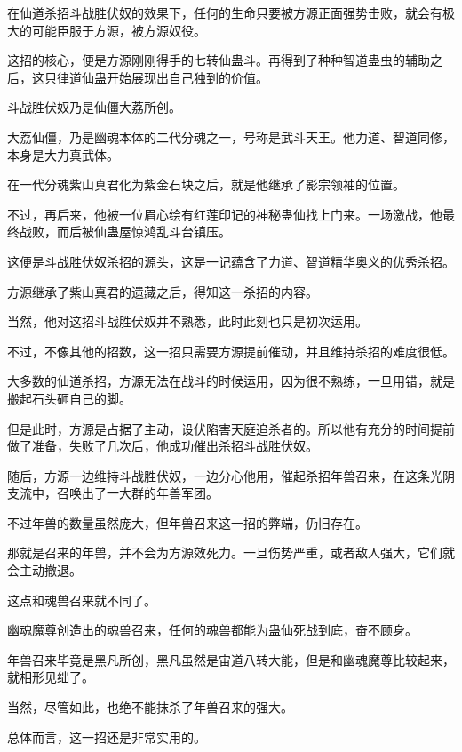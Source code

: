 
\begin{this_body}



在仙道杀招斗战胜伏奴的效果下，任何的生命只要被方源正面强势击败，就会有极大的可能臣服于方源，被方源奴役。

这招的核心，便是方源刚刚得手的七转仙蛊斗。再得到了种种智道蛊虫的辅助之后，这只律道仙蛊开始展现出自己独到的价值。

斗战胜伏奴乃是仙僵大荔所创。

大荔仙僵，乃是幽魂本体的二代分魂之一，号称是武斗天王。他力道、智道同修，本身是大力真武体。

在一代分魂紫山真君化为紫金石块之后，就是他继承了影宗领袖的位置。

不过，再后来，他被一位眉心绘有红莲印记的神秘蛊仙找上门来。一场激战，他最终战败，而后被仙蛊屋惊鸿乱斗台镇压。

这便是斗战胜伏奴杀招的源头，这是一记蕴含了力道、智道精华奥义的优秀杀招。

方源继承了紫山真君的遗藏之后，得知这一杀招的内容。

当然，他对这招斗战胜伏奴并不熟悉，此时此刻也只是初次运用。

不过，不像其他的招数，这一招只需要方源提前催动，并且维持杀招的难度很低。

大多数的仙道杀招，方源无法在战斗的时候运用，因为很不熟练，一旦用错，就是搬起石头砸自己的脚。

但是此时，方源是占据了主动，设伏陷害天庭追杀者的。所以他有充分的时间提前做了准备，失败了几次后，他成功催出杀招斗战胜伏奴。

随后，方源一边维持斗战胜伏奴，一边分心他用，催起杀招年兽召来，在这条光阴支流中，召唤出了一大群的年兽军团。

不过年兽的数量虽然庞大，但年兽召来这一招的弊端，仍旧存在。

那就是召来的年兽，并不会为方源效死力。一旦伤势严重，或者敌人强大，它们就会主动撤退。

这点和魂兽召来就不同了。

幽魂魔尊创造出的魂兽召来，任何的魂兽都能为蛊仙死战到底，奋不顾身。

年兽召来毕竟是黑凡所创，黑凡虽然是宙道八转大能，但是和幽魂魔尊比较起来，就相形见绌了。

当然，尽管如此，也绝不能抹杀了年兽召来的强大。

总体而言，这一招还是非常实用的。


\end{this_body}
